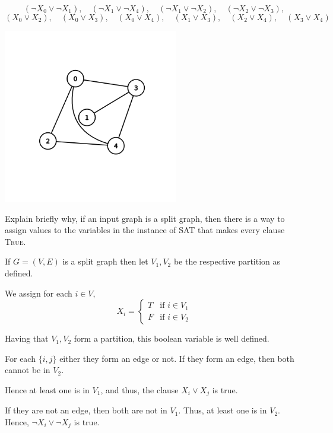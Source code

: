 \begin{questions}
	\begin{soln}
		\[
			(\lnot X_0 \lor \lnot X_1), \quad (\lnot X_1 \lor \lnot X_4), \quad
			(\lnot X_1 \lor \lnot X_2), \quad (\lnot X_2 \lor \lnot X_3),
		\]
		\[
			(X_0 \lor  X_2), \quad
			(X_0 \lor  X_3), \quad
			(X_0 \lor  X_4), \quad
			(X_1 \lor  X_3), \quad
			(X_2 \lor  X_4), \quad
			(X_3 \lor  X_4)
		\]
	\end{soln}

	\centerline{\includegraphics[width=3in]{graph1.png}}

	\ifsolutions\fi

	\question[3] Explain briefly why, if  an input graph is a split graph, then  there is a way to
	assign  values  to  the variables  in  the  instance  of  SAT that  makes  every  clause
	\textsc{True}.

	\begin{soln}
		If \(G = (V, E)\) is a split graph then let \(V_1, V_2\) be the respective partition as defined.

		We assign for each \(i \in V\),
		\[
			X_i =
			\begin{cases}
				T & \text{if } i \in V_1 \\
				F & \text{if } i \in V_2
			\end{cases}
		\]

		Having that \(V_1, V_2\) form a partition, this boolean variable is well defined.

		For each \(\{i, j\}\) either they form an edge or not. If they form an edge, then both cannot be in \(V_2\).

		Hence at least one is in \(V_1\), and thus, the clause \(X_i \lor X_j\) is true.

		If they are not an edge, then both are not in \(V_1\). Thus, at least one is in \(V_2\). Hence, \(\lnot X_i \lor \lnot X_j\) is true.


\end{soln}
\end{questions}
